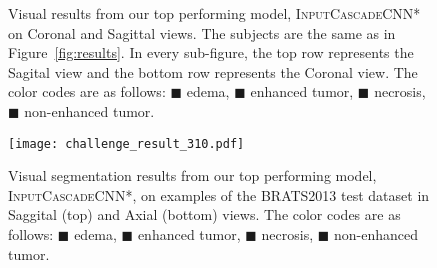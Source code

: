 \documentclass[final,5p,times,twocolumn]{elsarticle}
\begin{document}
{\begin{figure}[tp]
\caption{Visual results from our top performing model, \textsc{InputCascadeCNN*} on Coronal and Sagittal views. The subjects are the same as in Figure~\ref{fig:results}. In every sub-figure, the top row represents the Sagital view and the bottom row represents the Coronal view. The color codes are as follows:  \textcolor[RGB]{135,213,120}{$\blacksquare$} edema, \textcolor[RGB]{225,225,95}{$\blacksquare$} enhanced tumor,
\textcolor[RGB]{246,145,139}{$\blacksquare$} necrosis,
\textcolor[RGB]{124,167,208}{$\blacksquare$} non-enhanced tumor.}
\label{fig:multiple_views}
\end{figure}




\begin{figure}[tp]
\centering

\texttt{[image: challenge\_result\_310.pdf]}

\caption{Visual segmentation results from our top performing model, \textsc{InputCascadeCNN*}, on examples of the BRATS2013 test dataset in Saggital (top) and Axial (bottom) views. The color codes are as follows:  \textcolor[RGB]{135,213,120}{$\blacksquare$} edema, \textcolor[RGB]{225,225,95}{$\blacksquare$} enhanced tumor,
\textcolor[RGB]{246,145,139}{$\blacksquare$} necrosis,
\textcolor[RGB]{124,167,208}{$\blacksquare$} non-enhanced tumor.}
\label{fig:testresults}
\end{figure} 

\begin{table*}[tp]
\begin{center}
\caption{Performance of the \textsc{TwoPathCNN} model and variations. The second phase training is noted by appending `*' to the architecture name. The `Rank' column represents the ranking of each method in the online score board at the time of submission.} 


\end{center}
\end{table*}}
\end{document}
